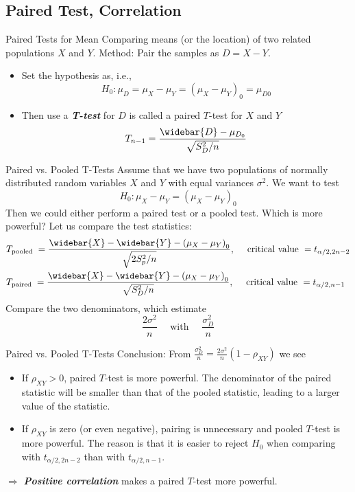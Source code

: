 \documentclass{beamer}
\newcommand{\bb}[1]{\textcolor{antiquefuchsia}{\textbf{\textit{#1}}}}
\begin{document}
\subsection{Paired Test, Correlation}
\begin{frame}{Paired Tests for Mean}
Comparing means (or the location) of two related populations $X$ and $Y$.
Method: Pair the samples as $D=X-Y$.
\begin{itemize}
\item Set the hypothesis as, i.e.,
$$
H_{0}: \mu_{D}=\mu_{X}-\mu_{Y}=\left(\mu_{X}-\mu_{Y}\right)_{0}=\mu_{D 0}
$$
\item Then use a \bb{T-test} for $D$ is called a paired $T$-test for $X$ and $Y$
$$
T_{n-1}=\frac{\widebar{D}-\mu_{D_{0}}}{\sqrt{S_{D}^{2} / n}}
$$
\end{itemize}
\end{frame}


\begin{frame}{Paired vs. Pooled T-Tests}
Assume that we have two populations of normally distributed random variables $X$ and $Y$ with equal variances $\sigma^{2}$. We want to test
$$
H_{0}: \mu_{X}-\mu_{Y}=\left(\mu_{X}-\mu_{Y}\right)_{0}
$$
Then we could either perform a paired test or a pooled test.
Which is more powerful? Let us compare the test statistics:
$$
\begin{aligned}
&T_{\text {pooled }}=\frac{\widebar{X}-\widebar{Y}-\left(\mu_{X}-\mu_{Y}\right)_{0}}{\sqrt{2 S_{p}^{2} / n}}, \quad \text { critical value }=t_{\alpha / 2,2 n-2} \\
&T_{\text {paired }}=\frac{\widebar{X}-\widebar{Y}-\left(\mu_{X}-\mu_{Y}\right)_{0}}{\sqrt{S_{D}^{2} / n}}, \quad \text { critical value }=t_{\alpha / 2, n-1}
\end{aligned}
$$
Compare the two denominators, which estimate
$$
\frac{2 \sigma^{2}}{n} \quad \text { with } \quad \frac{\sigma_{D}^{2}}{n}
$$

\end{frame}

\begin{frame}{Paired vs. Pooled T-Tests}
Conclusion: From
$
\frac{\sigma_{D}^{2}}{n}=\frac{2 \sigma^{2}}{n}\left(1-\rho_{X Y}\right)
$
we see
\begin{itemize}
\item If $\rho_{X Y}>0$, paired $T$-test is more powerful. The denominator of the paired statistic will be smaller than that of the pooled statistic, leading to a larger value of the statistic.
\item If $\rho_{X Y}$ is zero (or even negative), pairing is unnecessary and pooled $T$-test is more powerful. The reason is that it is easier to reject $H_{0}$ when comparing with $t_{\alpha / 2,2 n-2}$ than with $t_{\alpha / 2, n-1}$.
\end{itemize}

$\Rightarrow$ \bb{Positive correlation} makes a paired $T$-test more powerful.
\end{frame}
\end{document}

